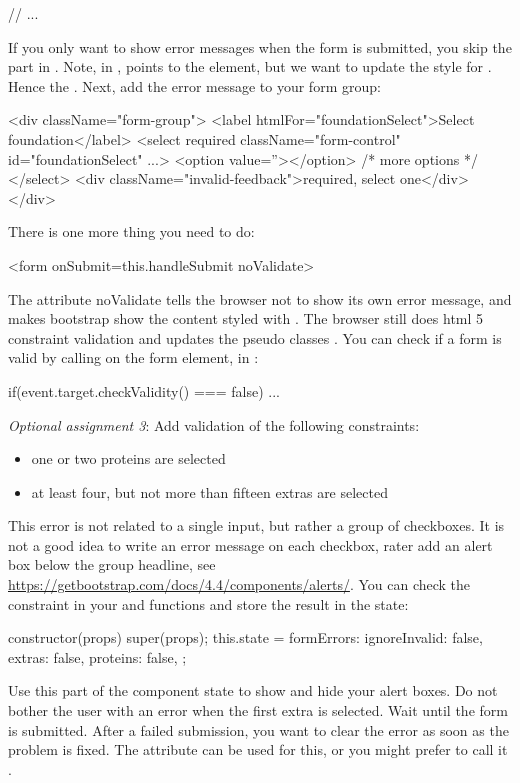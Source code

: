 \documentclass[fleqn, article, a4paper]{memoir}
\begin{document}
\begin{Assignments}
\begin{Code}
{  // ...
}
\end{Code}
If you only want to show error messages when the form is submitted, you skip the part in . Note, in ,  points to the  element, but we want to update the style for . Hence the . Next, add the error message to your  form group:
\begin{Code}
<div className="form-group">
  <label htmlFor="foundationSelect">Select foundation</label>
  <select required className="form-control" id="foundationSelect" ...>
    <option value=''></option>
    {/* more options */}
  </select>
  <div className="invalid-feedback">required, select one</div>
</div>
\end{Code}
There is one more thing you need to do:
\begin{Code}
<form onSubmit={this.handleSubmit} noValidate>
\end{Code}
The attribute noValidate tells the browser not to show its own error message, and makes bootstrap show the content styled with . The browser still does html 5 constraint validation and updates the pseudo classes . You can check if a form is valid by calling  on the form element, in :
\begin{Code}
if(event.target.checkValidity() === false){ ... }
\end{Code}

\item \emph{Optional assignment 3}: Add validation of the following constraints:
\begin{itemize}
  \item one or two proteins are selected
  \item at least four, but not more than fifteen extras are selected
\end{itemize}
This error is not related to a single input, but rather a group of checkboxes. It is not a good idea to write an error message on each checkbox, rater add an alert box below the group headline, see \url{https://getbootstrap.com/docs/4.4/components/alerts/}. You can check the constraint in your  and  functions and store the result in the state:
\begin{Code}
constructor(props) {
  super(props);
  this.state = {
    formErrors: {
      ignoreInvalid: false,
      extras: false,
      proteins: false,
    }
  };
}
\end{Code}
Use this part of the component state to show and hide your alert boxes. Do not bother the user with an error when the first extra is selected. Wait until the form is submitted. After a failed submission, you want to clear the error as soon as the problem is fixed. The attribute  can be used for this, or you might prefer to call it .

\end{Assignments}


\end{document}
